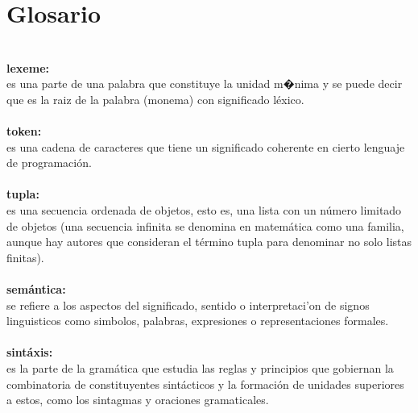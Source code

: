 \documentclass[12pt,oneside]{book}
\begin{document}
\chapter{Glosario}
\ \\
\textbf{lexeme:} \\ es una parte de una palabra que constituye la unidad m�nima y se puede decir que es la raiz de la palabra (monema) con significado l\'exico.
\ \\ \ \\ 
\textbf{token:} \\  es una cadena de caracteres que tiene un significado coherente en cierto lenguaje de programaci\'on.
\ \\ \ \\ 
\textbf{tupla:} \\es una secuencia ordenada de objetos, esto es, una lista con un n\'umero limitado de objetos (una secuencia infinita se denomina en matem\'atica como una familia, aunque hay autores que consideran el t\'ermino tupla para denominar no solo listas finitas).
\ \\ \ \\ 
\textbf{sem\'antica:} \\ se refiere a los aspectos del significado, sentido o interpretaci'on de signos linguisticos como simbolos, palabras, expresiones o representaciones formales.
\ \\ \ \\
\textbf{sint\'axis:} \\ es la parte de la gram\'atica que estudia las reglas y principios que gobiernan la combinatoria de constituyentes sint\'acticos y la formaci\'on de unidades superiores a estos, como los sintagmas y oraciones gramaticales.
\end{document}
